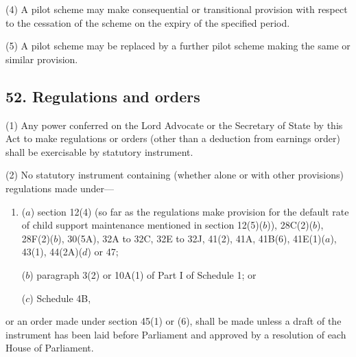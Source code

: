 \documentclass[12pt,a4paper]{article}
\begin{document}
(4)
A pilot scheme may make consequential or transitional provision with respect to the cessation of the scheme on the expiry of the specified period.

(5)
A pilot scheme may be replaced by a further pilot scheme making the same or similar provision.


\subsection{52. Regulations and orders}

(1) Any power conferred on the Lord Advocate or the Secretary of State by this Act to make regulations or orders (other than a deduction from earnings order) shall be exercisable by statutory instrument.


(2) No statutory instrument containing (whether alone or with other provisions) regulations made under---
\begin{enumerate}\item[]
($a$) section 12(4) (so far as the regulations make provision for the default
rate of child support maintenance mentioned in section 12(5)($b$)), 28C(2)($b$),
28F(2)($b$), 30(5A), 32A to 32C, 32E to 32J, 41(2), 41A, 41B(6), 41E(1)($a$), 43(1), 44(2A)($d$) or
47;

($b$) paragraph 3(2) or 10A(1) of Part I of Schedule 1; or

($c$) Schedule 4B, 
\end{enumerate}
or an order made under section 45(1) or (6), shall be made unless a draft of the
instrument has been laid before Parliament and approved by a resolution of each House of Parliament.
\end{document}
